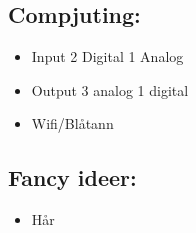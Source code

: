 \documentclass[12pt, a4paper]{article}
\begin{document}
\subsection {Compjuting:}
\begin{itemize}
    \item Input
2 Digital
1 Analog
    \item Output
3 analog
1 digital
    \item Wifi/Blåtann
\end{itemize}


\subsection {Fancy ideer: }
\begin{itemize}
    \item Hår
\end{itemize}
\end{document}
